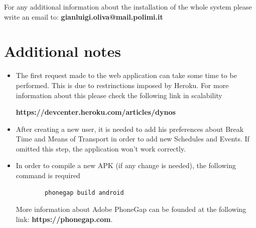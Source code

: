 \documentclass[numbers=noenddot, 12pt, a4paper, oneside]{scrbook}
\begin{document}
For any additional information about the installation of the whole system please write an email to: \textbf{gianluigi.oliva@mail.polimi.it} \\\newline

\section*{Additional notes}

\begin{itemize}
	\item The first request made to the web application can take some time to be performed. This is due to restrinctions imposed by Heroku.
	For more information about this please check the following link in scalability
	
	\textbf{https://devcenter.heroku.com/articles/dynos}
	
	\item After creating a new user, it is needed to add his preferences about Break Time and Means of Transport in order to add new Schedules and Events. If omitted this step, the application won't work correctly.
	
	\item In order to compile a new APK (if any change is needed), the following command is required
	\begin{lstlisting}
		phonegap build android
	\end{lstlisting}
	More information about Adobe PhoneGap can be founded at the following link: \textbf{https://phonegap.com}.
	
\end{itemize}
\end{document}
